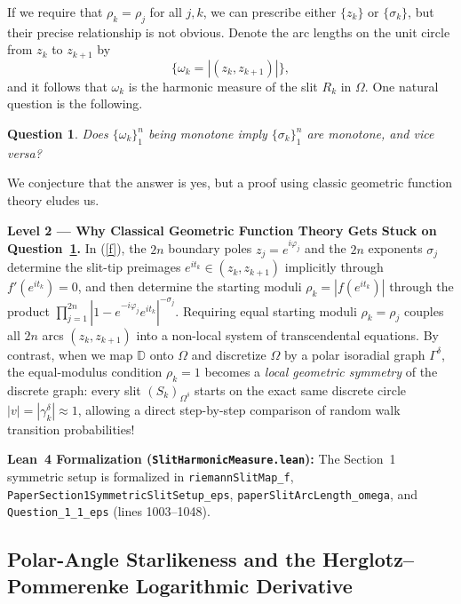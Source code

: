 \documentclass[11pt,reqno]{amsart}
\newtheorem{ques}[thm]{Question}
\numberwithin{equation}{section}
\renewcommand{\phi}{\varphi}
\newcommand{\D}{\mathbb{D}}
\begin{document}
If we require that $\rho_k = \rho_j$ for all $j,k$, we can prescribe either $\{z_k\}$ or $\{\sigma_k\}$, but their precise relationship is not obvious. Denote the arc lengths on the unit circle from $z_k$ to $z_{k+1}$ by
$$\{\omega_k = |(z_k,z_{k+1})|\},$$
and it follows that $\omega_k$ is the harmonic measure of the slit $R_k$ in $\varOmega$.
One natural question is the following.
\begin{ques} \label{question}
Does $\{\omega_k\}_1^n$ being monotone imply $\{\sigma_k\}_1^n$ are monotone, and vice versa?
\end{ques}

We conjecture that the answer is yes, but a proof using classic geometric function theory eludes us.

\begin{leveltwo}
\noindent\textbf{\textcolor{l2border}{Level 2 --- Why Classical Geometric Function Theory Gets Stuck on Question~\ref{question}.}}
In (\ref{f}), the $2n$ boundary poles $z_j = e^{i\phi_j}$ and the $2n$ exponents $\sigma_j$ determine the slit-tip preimages $e^{it_k} \in (z_k, z_{k+1})$ implicitly through $f'(e^{it_k}) = 0$, and then determine the starting moduli $\rho_k = |f(e^{it_k})|$ through the product $\prod_{j=1}^{2n} |1 - e^{-i\phi_j} e^{it_k}|^{-\sigma_j}$. Requiring equal starting moduli $\rho_k = \rho_j$ couples all $2n$ arcs $(z_k, z_{k+1})$ into a non-local system of transcendental equations. By contrast, when we map $\D$ onto $\varOmega$ and discretize $\varOmega$ by a polar isoradial graph $\varGamma^{\delta}$, the equal-modulus condition $\rho_k = 1$ becomes a \emph{local geometric symmetry} of the discrete graph: every slit $(S_k)_{\Omega^{\delta}}$ starts on the exact same discrete circle $|v| = |\gamma_k^{\delta}| \approx 1$, allowing a direct step-by-step comparison of random walk transition probabilities!

\smallskip
\noindent\textbf{\textcolor{leannote}{Lean~4 Formalization (\texttt{SlitHarmonicMeasure.lean}):}} The Section~1 symmetric setup is formalized in \texttt{riemannSlitMap\_f}, \texttt{PaperSection1SymmetricSlitSetup\_eps}, \texttt{paperSlitArcLength\_omega}, and \texttt{Question\_1\_1\_eps} (lines 1003--1048).
\end{leveltwo}

\subsection{Polar-Angle Starlikeness and the Herglotz--Pommerenke Logarithmic Derivative}
\end{document}
